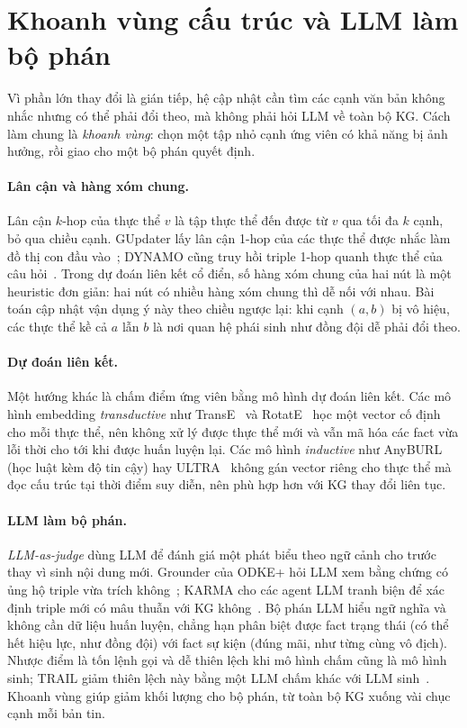\section{Khoanh vùng cấu trúc và LLM làm bộ phán}\label{sec:bg-localize}

Vì phần lớn thay đổi là gián tiếp, hệ cập nhật cần tìm các cạnh văn bản không nhắc nhưng có thể phải đổi theo, mà không phải hỏi LLM về toàn bộ KG.
Cách làm chung là \textit{khoanh vùng}: chọn một tập nhỏ cạnh ứng viên có khả năng bị ảnh hưởng, rồi giao cho một bộ phán quyết định.

\paragraph*{Lân cận và hàng xóm chung.}
Lân cận $k$-hop của thực thể $v$ là tập thực thể đến được từ $v$ qua tối đa $k$ cạnh, bỏ qua chiều cạnh.
GUpdater lấy lân cận 1-hop của các thực thể được nhắc làm đồ thị con đầu vào~\cite{tang2019gupdate}; DYNAMO cũng truy hồi triple 1-hop quanh thực thể của câu hỏi~\cite{dynamo2025}.
Trong dự đoán liên kết cổ điển, số hàng xóm chung của hai nút là một heuristic đơn giản: hai nút có nhiều hàng xóm chung thì dễ nối với nhau.
Bài toán cập nhật vận dụng ý này theo chiều ngược lại: khi cạnh $(a, b)$ bị vô hiệu, các thực thể kề cả $a$ lẫn $b$ là nơi quan hệ phái sinh như đồng đội dễ phải đổi theo.

\paragraph*{Dự đoán liên kết.}
Một hướng khác là chấm điểm ứng viên bằng mô hình dự đoán liên kết.
Các mô hình embedding \textit{transductive} như TransE~\cite{bordes2013transe} và RotatE~\cite{sun2019rotate} học một vector cố định cho mỗi thực thể, nên không xử lý được thực thể mới và vẫn mã hóa các fact vừa lỗi thời cho tới khi được huấn luyện lại.
Các mô hình \textit{inductive} như AnyBURL~\cite{meilicke2019anyburl} (học luật kèm độ tin cậy) hay ULTRA~\cite{galkin2024ultra} không gán vector riêng cho thực thể mà đọc cấu trúc tại thời điểm suy diễn, nên phù hợp hơn với KG thay đổi liên tục.

\paragraph*{LLM làm bộ phán.}
\textit{LLM-as-judge} dùng LLM để đánh giá một phát biểu theo ngữ cảnh cho trước thay vì sinh nội dung mới.
Grounder của ODKE+ hỏi LLM xem bằng chứng có ủng hộ triple vừa trích không~\cite{odke2025}; KARMA cho các agent LLM tranh biện để xác định triple mới có mâu thuẫn với KG không~\cite{lu2025karma}.
Bộ phán LLM hiểu ngữ nghĩa và không cần dữ liệu huấn luyện, chẳng hạn phân biệt được fact trạng thái (có thể hết hiệu lực, như đồng đội) với fact sự kiện (đúng mãi, như từng cùng vô địch).
Nhược điểm là tốn lệnh gọi và dễ thiên lệch khi mô hình chấm cũng là mô hình sinh; TRAIL giảm thiên lệch này bằng một LLM chấm khác với LLM sinh~\cite{trail2026}.
Khoanh vùng giúp giảm khối lượng cho bộ phán, từ toàn bộ KG xuống vài chục cạnh mỗi bản tin.

